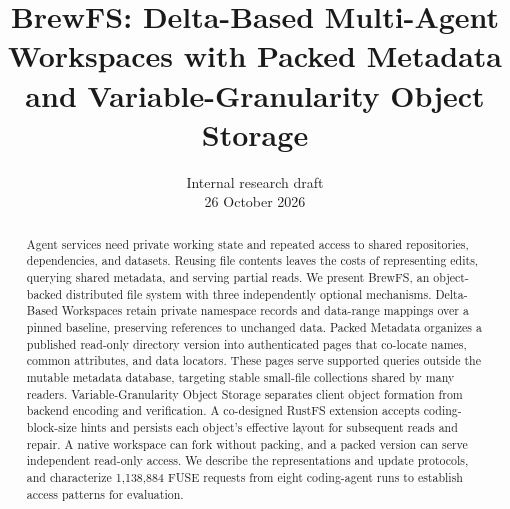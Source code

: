 \documentclass[letterpaper,twocolumn,10pt]{article}
\newcommand{\sysname}{BrewFS}
\newcommand{\sys}{\sysname\xspace}
\begin{document}
\title{\sysname: Delta-Based Multi-Agent Workspaces with Packed Metadata\\
and Variable-Granularity Object Storage}
\author{Internal research draft\\26 October 2026}
\date{}
\maketitle
\begin{abstract}
Agent services need private working state and repeated access to shared
repositories, dependencies, and datasets. Reusing file contents leaves
the costs of representing edits, querying shared metadata, and serving
partial reads. We present \sys, an object-backed distributed file system
with three independently optional mechanisms. Delta-Based Workspaces
retain private namespace records and data-range mappings over a pinned
baseline, preserving references to unchanged data. Packed Metadata
organizes a published read-only directory version into authenticated
pages that co-locate names, common attributes, and data locators. These
pages serve supported queries outside the mutable metadata database,
targeting stable small-file collections shared by many readers.
Variable-Granularity Object Storage separates client object formation
from backend encoding and verification. A co-designed RustFS extension
accepts coding-block-size hints and persists each object's effective
layout for subsequent reads and repair. A native workspace can fork
without packing, and a packed version can serve independent read-only
access. We describe the
representations and update protocols, and characterize 1,138,884 FUSE
requests from eight coding-agent runs to establish access patterns
for evaluation.
\end{abstract}












\label{page:bodyend}


\end{document}
